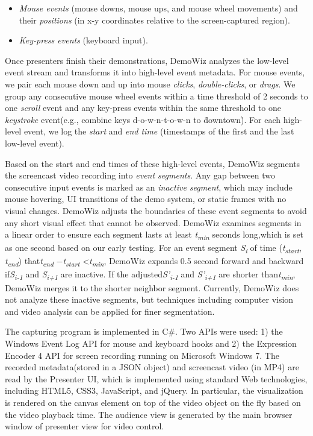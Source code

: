 \begin{itemize}
  \itemsep -2pt
  \item \textit{Mouse events} (mouse downs, mouse ups, and mouse wheel movements) and their \textit{positions} (in x-y coordinates relative to the screen-captured region).
  \item \textit{Key-press events} (keyboard input).
\end{itemize}

Once presenters finish their demonstrations, DemoWiz analyzes the low-level event stream and transforms it into high-level event metadata. For mouse events, we pair each mouse down and up into mouse \textit{clicks}, \textit{double-clicks}, or \textit{drags}. We group any consecutive mouse wheel events within a time threshold of 2 seconds to one \textit{scroll} event and any key-press events within the same threshold to one \textit{keystroke} event(e.g., combine keys d-o-w-n-t-o-w-n to \"downtown\"). For each high-level event, we log the \textit{start} and \textit{end time} (timestamps of the first and the last low-level event).

Based on the start and end times of these high-level events, DemoWiz segments the screencast video recording into \textit{event segments}. Any gap between two consecutive input events is marked as an \textit{inactive segment}, which may include mouse hovering, UI transitions of the demo system, or static frames with no visual changes. DemoWiz adjusts the boundaries of these event segments to avoid any short visual effect that cannot be observed. DemoWiz examines segments in a linear order to ensure each segment lasts at least \textit{t}\textit{\textsubscript{min}} seconds long,which is set as one second based on our early testing. For an event segment \textit{S}\textit{\textsubscript{i}} of time (\textit{t}\textit{\textsubscript{start}},\textit{ t}\textit{\textsubscript{end}}) that\textit{t}\textit{\textsubscript{end }}\textit{$-$t}\textit{\textsubscript{start}} {\textless}\textit{t}\textit{\textsubscript{min}}, DemoWiz expands 0.5 second forward and backward if\textit{S}\textit{\textsubscript{i-1}} and \textit{S}\textit{\textsubscript{i+1}} are inactive. If the adjusted\textit{S’}\textit{\textsubscript{i-1}} and \textit{S’}\textit{\textsubscript{i+1}}\textit{ }are shorter than\textit{t}\textit{\textsubscript{min}}, DemoWiz merges it to the shorter neighbor segment. Currently, DemoWiz does not analyze these inactive segments, but techniques including computer vision and video analysis \cite{Banovic:2012kd,chi2012mixt} can be applied for finer segmentation.

The capturing program is implemented in C\#. Two APIs were used: 1) the Windows Event Log API for mouse and keyboard hooks and 2) the Expression Encoder 4 API for screen recording running on Microsoft Windows 7. The recorded metadata(stored in a JSON object) and screencast video (in MP4) are read by the Presenter UI, which is implemented using standard Web technologies, including HTML5, CSS3, JavaScript, and jQuery. In particular, the visualization is rendered on the canvas element on top of the video object on the fly based on the video playback time. The audience view is generated by the main browser window of presenter view for video control.
